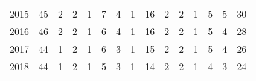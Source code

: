 \begin{tabular}{lrrrrrrrrrrrrrr}
2015 &               45 &             2 &        2 &          1 &              7 &            4 &           1 &           16 &         2 &             2 &              1 &        5 &               5 &           30 \\
2016 &               46 &             2 &        2 &          1 &              6 &            4 &           1 &           16 &         2 &             2 &              1 &        5 &               4 &           28 \\
2017 &               44 &             1 &        2 &          1 &              6 &            3 &           1 &           15 &         2 &             2 &              1 &        5 &               4 &           26 \\
2018 &               44 &             1 &        2 &          1 &              5 &            3 &           1 &           14 &         2 &             2 &              1 &        4 &               3 &           24 \\
\bottomrule
\end{tabular}
